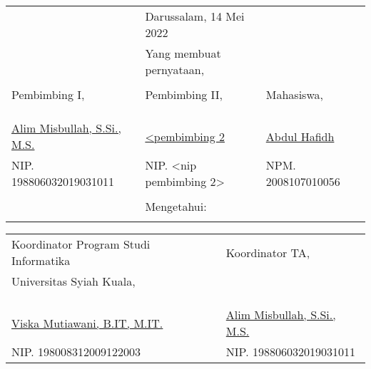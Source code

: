\vspace{0.4cm}
{\renewcommand{\arraystretch}{0.8}
\centering
\begin{tabular}{lll}
	&Darussalam, 14 Mei 2022		& \\
	&Yang membuat pernyataan,			& \\
	&&\\
	Pembimbing I,							&Pembimbing II,							&Mahasiswa,\\
	&&\\
	&&\\
	&&\\
	\underline{Alim Misbullah, S.Si., M.S.}	&\underline{<pembimbing 2} &\underline{Abdul Hafidh}\\
	NIP. 198806032019031011				&NIP. <nip pembimbing 2>				&NPM. 2008107010056\\
	&&\\
	&Mengetahui:\\			&
\end{tabular}
}
{\renewcommand{\arraystretch}{0.8}
\begin{tabular}{lll}
	Koordinator Program Studi Informatika	&\qquad\qquad  &Koordinator TA,\\
	Universitas Syiah Kuala,&\quad\quad  &\\
	&&\\
	&&\\
	&&\\
	\underline{Viska Mutiawani, B.IT, M.IT.}	&\quad\quad  &\underline{Alim Misbullah, S.Si., M.S.}\\
	NIP. 198008312009122003						&\quad\quad  &NIP. 198806032019031011				
\end{tabular}
}